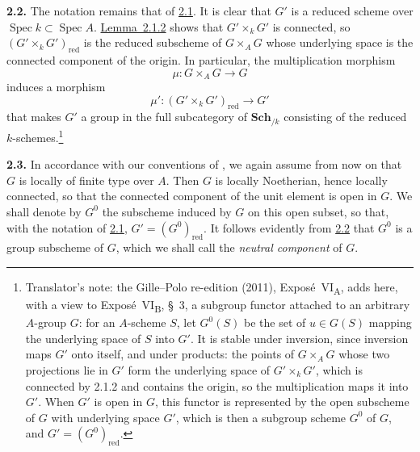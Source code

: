 \medskip
{}\label{par:sga3-VIA-2.2}%
\noindent\textbf{2.2.}
The notation remains that of \hyperref[par:sga3-VIA-2.1]{2.1}. It is clear that \(G'\) is a reduced
scheme over \(\operatorname{Spec}k\subset\operatorname{Spec}A\). \hyperref[lem:sga3-VIA-2.1.2]{Lemma~2.1.2} shows that \(G'\times_kG'\) is connected, so
\((G'\times_kG')_{\mathrm{red}}\) is the reduced subscheme of
\(G\times_AG\) whose underlying space is the connected component of the
origin. In particular, the multiplication morphism
\[
  \mu:G\times_AG\longrightarrow G
\]
induces a morphism
\[
  \mu':(G'\times_kG')_{\mathrm{red}}\longrightarrow G'
\]
that makes \(G'\) a group in the full subcategory of
\(\mathbf{Sch}_{/k}\) consisting of the reduced \(k\)-schemes.\footnote{Translator's note: the Gille--Polo re-edition (2011),
Exposé~VI\textsubscript{A}, adds here, with a view to Exposé~VI\textsubscript{B}, \S~3, a subgroup
functor attached to an arbitrary \(A\)-group \(G\): for an \(A\)-scheme \(S\), let \(G^0(S)\) be the
set of \(u\in G(S)\) mapping the underlying space of \(S\) into \(G'\). It is stable under inversion,
since inversion maps \(G'\) onto itself, and under products: the points of \(G\times_AG\) whose two
projections lie in \(G'\) form the underlying space of \(G'\times_kG'\), which is connected by 2.1.2
and contains the origin, so the multiplication maps it into \(G'\). When \(G'\) is open in \(G\),
this functor is represented by the open subscheme of \(G\) with underlying space \(G'\), which is
then a subgroup scheme \(G^0\) of \(G\), and \(G'=(G^0)_{\mathrm{red}}\).}

\medskip
{}\label{par:sga3-VIA-2.3}%
\noindent\textbf{2.3.}
In accordance with our conventions of , we again assume from now on that
\(G\) is locally of finite type over \(A\). Then \(G\) is locally
Noetherian, hence locally connected, so that the connected component of
the unit element is open in \(G\). We shall denote by \(G^0\) the
subscheme induced by \(G\) on this open subset, so that, with the
notation of \hyperref[par:sga3-VIA-2.1]{2.1}, \(G'=(G^0)_{\mathrm{red}}\). It follows evidently from
\hyperref[par:sga3-VIA-2.2]{2.2} that \(G^0\) is a group subscheme of \(G\), which we shall call the
\emph{neutral component} of \(G\).

